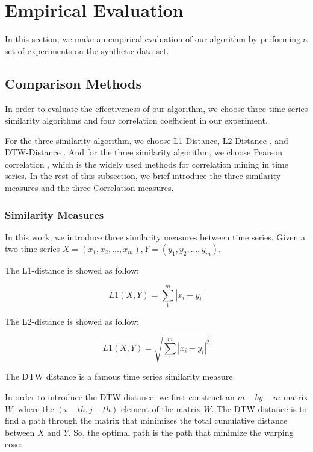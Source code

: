 \section{Empirical Evaluation}
In this section, we make an empirical evaluation of our algorithm by performing a set of experiments on the synthetic data set.

\subsection{Comparison Methods}
In order to evaluate the effectiveness of our algorithm, we choose three time series similarity algorithms and four correlation coefficient in our experiment. 

For the three similarity algorithm, we choose L1-Distance, L2-Distance \cite{han2011data}, and DTW-Distance \cite{muller2007dynamic}. And for the three similarity algorithm, we choose Pearson correlation \cite{nagelkerke1991note}, which is the widely used methods for correlation mining in time series.
In the rest of this subsection, we brief introduce the three similarity measures and the three Correlation measures.

\subsubsection{Similarity Measures}

In this work, we introduce three similarity measures between time series.
Given a two time series 
$X=(x_1,x_2,...,x_m),Y=(y_1,y_2,...,y_m)$.

The L1-distance is showed as follow:

\begin{equation}
L1(X,Y) = \sum_{1}^{m}|x_i-y_i|
\end{equation}

The L2-distance is showed as follow:

\begin{equation}
L1(X,Y) = \sqrt{\sum_{1}^{m}|x_i-y_i|^2}
\end{equation}

The DTW distance is a famous time series similarity measure.

In order to introduce the DTW distance, we first construct an $m-by-m$ matrix $W$, where the $(i-{th},j-{th})$ element of the matrix $W$. The DTW distance is to find a path through the matrix that minimizes the total cumulative distance between $X$ and $Y$. 
So, the optimal path is the path that minimize the warping cose:

